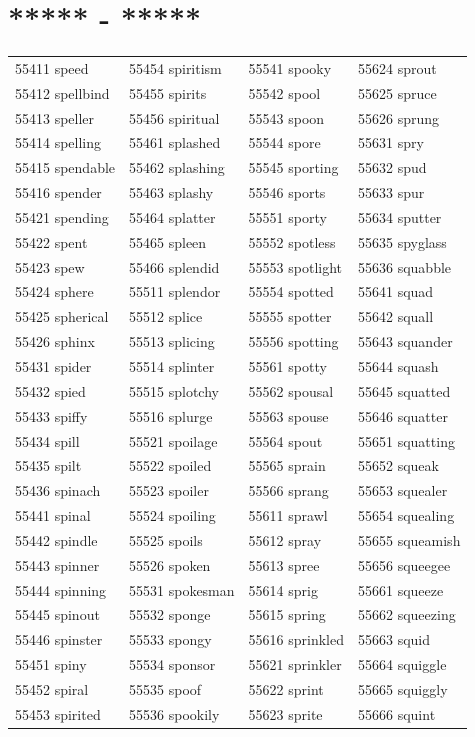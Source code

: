 \documentclass[10pt, oneside]{book}
\begin{document}
\begin{table}[h]
	\centering
	\section*{***** - *****}
	\begin{tabular}{l l l l}
55411 speed &55454 spiritism &55541 spooky &55624 sprout\\
55412 spellbind &55455 spirits &55542 spool &55625 spruce\\
55413 speller &55456 spiritual &55543 spoon &55626 sprung\\
55414 spelling &55461 splashed &55544 spore &55631 spry\\
55415 spendable &55462 splashing &55545 sporting &55632 spud\\
55416 spender &55463 splashy &55546 sports &55633 spur\\
55421 spending &55464 splatter &55551 sporty &55634 sputter\\
55422 spent &55465 spleen &55552 spotless &55635 spyglass\\
55423 spew &55466 splendid &55553 spotlight &55636 squabble\\
55424 sphere &55511 splendor &55554 spotted &55641 squad\\
55425 spherical &55512 splice &55555 spotter &55642 squall\\
55426 sphinx &55513 splicing &55556 spotting &55643 squander\\
55431 spider &55514 splinter &55561 spotty &55644 squash\\
55432 spied &55515 splotchy &55562 spousal &55645 squatted\\
55433 spiffy &55516 splurge &55563 spouse &55646 squatter\\
55434 spill &55521 spoilage &55564 spout &55651 squatting\\
55435 spilt &55522 spoiled &55565 sprain &55652 squeak\\
55436 spinach &55523 spoiler &55566 sprang &55653 squealer\\
55441 spinal &55524 spoiling &55611 sprawl &55654 squealing\\
55442 spindle &55525 spoils &55612 spray &55655 squeamish\\
55443 spinner &55526 spoken &55613 spree &55656 squeegee\\
55444 spinning &55531 spokesman &55614 sprig &55661 squeeze\\
55445 spinout &55532 sponge &55615 spring &55662 squeezing\\
55446 spinster &55533 spongy &55616 sprinkled &55663 squid\\
55451 spiny &55534 sponsor &55621 sprinkler &55664 squiggle\\
55452 spiral &55535 spoof &55622 sprint &55665 squiggly\\
55453 spirited &55536 spookily &55623 sprite &55666 squint\\
	\end{tabular}
 \end{table}
\end{document}
